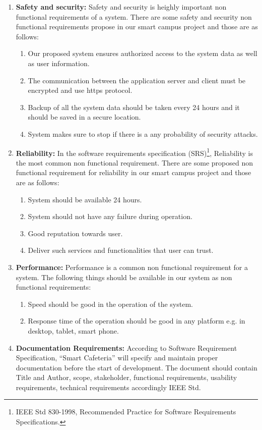 \begin{enumerate}
\item \textbf{Safety and security:} Safety and security is heighly important
non functional requirements of a system. There are some safety
and security non functional requirements propose in our smart campus
project and those are as follows:
\begin{enumerate}
\item  Our proposed system ensures authorized access to the system data as well as
user information.
\item The communication between the application server and client must be
encrypted and use https protocol.
\item Backup of all the system data should be taken every 24 hours and it should
be saved in a secure location.
\item System makes sure to stop if there is a any probability of security attacks.
\end{enumerate}

\item \textbf{Reliability:} In the software requirements specification
(SRS)\footnote{ IEEE Std 830-1998, Recommended Practice for Software
Requirements Specifications.}, Reliability is the most common non functional
requirement. There are some proposed non functional requirement for reliability in
our smart campus project and those are as follows:
\begin{enumerate}
\item	System should be available 24 hours.
\item	System should not have any failure during operation.
\item	Good reputation towards user.
\item	Deliver such services and functionalities that user can trust.
\end{enumerate}
\item \textbf{Performance:} Performance is a common non functional
requirement for a system. The following things should be available in our
system as non functional requirements:
\begin{enumerate}
\item Speed should be good in the operation of the system.
\item Response time of the operation should be good in any platform e.g. in
desktop, tablet, smart phone.
\end{enumerate}

\item \textbf{Documentation Requirements:} According to Software Requirement
Specification, ``Smart Cafeteria'' will specify and maintain proper
documentation before the start of development. The document should contain Title
and Author, scope, stakeholder, functional requirements, usability requirements,
technical requirements accordingly IEEE Std.

\end{enumerate}


